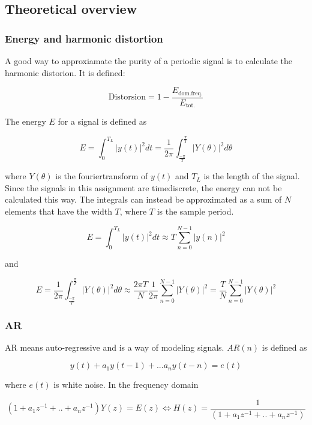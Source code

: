 \documentclass[12pt]{article}
\begin{document}
\subsection{Theoretical overview}

\subsubsection{Energy and harmonic distortion}
A good way to approxiamate the purity of a periodic signal is to calculate the harmonic distorion. It is defined:

\begin{equation}
  \mathrm{Distorsion} = 1-\frac{E_{\mathrm{dom. freq.}}}{E_{\mathrm{tot.}}}
\end{equation}

The energy $E$ for a signal is defined as

\[
E=\int_{0}^{T_{L}} \vert y(t)\vert ^2 dt=\frac{1}{2\pi}\int_{\frac{-\pi}{T}}^{\frac{\pi}{T}}\vert Y(\theta)\vert ^2d\theta
\]

where $Y(\theta)$ is the fouriertransform of $y(t)$ and $T_L$ is the length of the signal. Since the signals in this assignment are timediscrete, the energy can not be calculated this way. The integrals can instead be approximated as a sum of $N$ elements that have the width $T$, where $T$ is the sample period.

\begin{equation}
E=\int_{0}^{T_{L}} \vert y(t)\vert^2 dt\approx T\sum_{n=0}^{N-1}\vert y(n) \vert^2 
\label{A} 
\end{equation}

and

\begin{equation}
E=\frac{1}{2\pi}\int_{\frac{-\pi}{T}}^{\frac{\pi}{T}}\vert Y(\theta)\vert ^2d\theta \approx \frac{2\pi T}{N}\frac{1}{2\pi}\sum_{n=0}^{N-1}\vert Y(\theta) \vert^2=\frac{T}{N}\sum_{n=0}^{N-1}\vert Y(\theta) \vert^2 
\label{enwhis}
\end{equation}

\subsubsection{AR}
\label{ar} 
AR means auto-regressive and is a way of modeling signals. $AR(n)$ is defined as

\[
y(t)+a_1y(t-1)+...a_ny(t-n)=e(t) 
\]

where $e(t)$ is white noise. In the frequency domain

\begin{equation}
\label{Hfreq}
(1+a_1z^{-1}+..+a_nz^{-1})Y(z)=E(z) \Leftrightarrow H(z) = \frac{1}{(1+a_1z^{-1}+..+a_nz^{-1})}
\end{equation}
\end{document}
